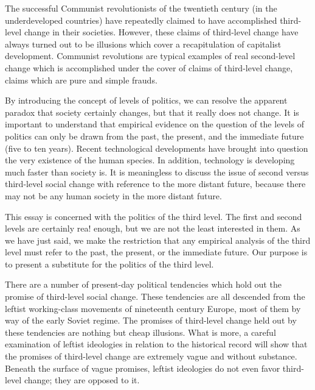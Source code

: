 \documentclass[10pt,twoside,draft]{memoir}
\begin{document}
{{{The successful Communist revolutionists of the twentieth century (in 
the underdeveloped countries) have repeatedly claimed to have accomplished 
third-level change in their societies. However, these claims of third-level 
change have always turned out to be illusions which cover a recapitulation of 
capitalist development. Communist revolutions are typical examples of real 
second-level change which is accomplished under the cover of claims of 
third-level change, claims which are pure and simple frauds. 

By introducing the concept of levels of politics, we can resolve the 
apparent paradox that society certainly changes, but that it really does not 
change. It is important to understand that empirical evidence on the 
question of the levels of politics can only be drawn from the past, the 
present, and the immediate future (five to ten years). Recent technological 
developments have brought into question the very existence of the human 
species. In addition, technology is developing much faster than society is. It 
is meaningless to discuss the issue of second versus third-level social change 
with reference to the more distant future, because there may not be any 
human society in the more distant future. 

This essay is concerned with the politics of the third level. The first and 
second levels are certainly rea! enough, but we are not the least interested in 
them. As we have just said, we make the restriction that any empirical 
analysis of the third level must refer to the past, the present, or the 
immediate future. Our purpose is to present a substitute for the politics of 
the third level. 

There are a number of present-day political tendencies which hold out 
the promise of third-level social change. These tendencies are all descended 
from the leftist working-class movements of nineteenth century Europe, 
most of them by way of the early Soviet regime. The promises of third-level 
change held out by these tendencies are nothing but cheap illusions. What is 
more, a careful examination of leftist ideologies in relation to the historical 
record will show that the promises of third-level change are extremely vague 
and without substance. Beneath the surface of vague promises, leftist 
ideologies do not even favor third-level change; they are opposed to it. 

}}}
\end{document}

